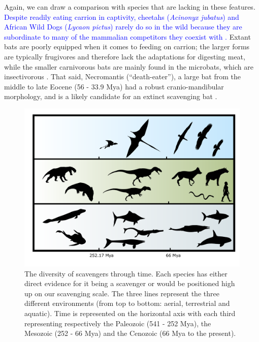 \documentclass[a4paper,12pt]{article}
\begin{document}
Again, we can draw a comparison with species that are lacking in these features. 
\textcolor{blue}{Despite readily eating carrion in captivity, cheetahs (\textit{Acinonyx jubatus}) and African Wild Dogs (\textit{Lycaon pictus}) rarely do so in the wild because they are subordinate to many of the mammalian competitors they coexist with \citep{pereira2014facultative}.} 
Extant bats are poorly equipped when it comes to feeding on carrion; the larger forms are typically frugivores and therefore lack the adaptations for digesting meat, while the smaller carnivorous bats are mainly found in the microbats, which are insectivorous \citep{aguirre2003implications}.   
That said, Necromantis (“death-eater”), a large bat from the middle to late Eocene (56 - 33.9 Mya) had a robust cranio-mandibular morphology, and is a likely candidate for an extinct scavenging bat \citep{Weithofer_Necromantis_1887,Hand_Necromantis_2012}.

\begin{figure}[!htbp]
\centering
   \includegraphics[width=1\textwidth]{timeline_figure/timeLine.pdf}
\caption{The diversity of scavengers through time. Each species has either direct evidence for it being a scavenger or would be positioned high up on our scavenging scale. The three lines represent the three different environments (from top to bottom: aerial, terrestrial and aquatic). Time is represented on the horizontal axis with each third representing respectively the Paleozoic (541 - 252 Mya), the Mesozoic (252 - 66 Mya) and the Cenozoic (66 Mya to the present).}
\label{Timeline}
\end{figure}
\end{document}
